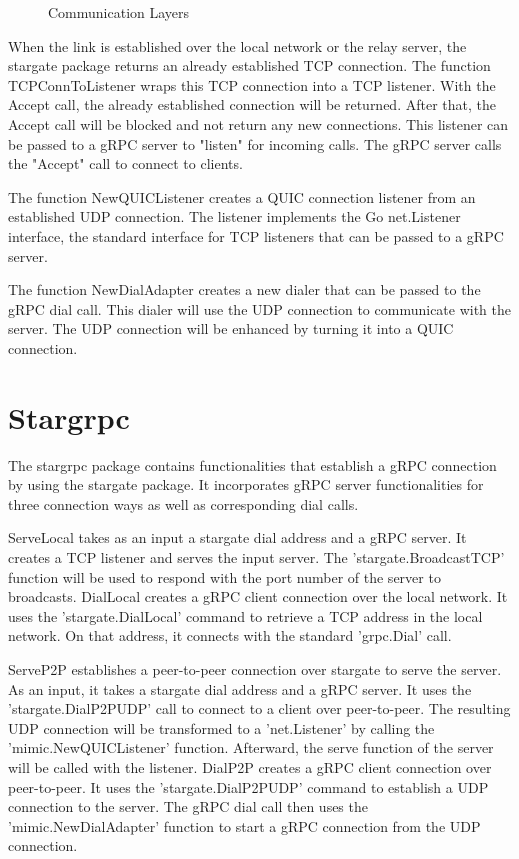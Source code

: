 \begin{figure}
  \centering
  
  \caption{Communication Layers}
  \label{fig:Communication-Layer}
\end{figure}

When the link is established over the local network or the relay server, the stargate package returns an already established TCP connection. The function TCPConnToListener wraps this TCP connection into a TCP listener. With the Accept call, the already established connection will be returned. After that, the Accept call will be blocked and not return any new connections. This listener can be passed to a gRPC server to "listen" for incoming calls. The gRPC server calls the "Accept" call to connect to clients.

The function NewQUICListener creates a QUIC connection listener from an established UDP connection. The listener implements the Go net.Listener interface, the standard interface for TCP listeners that can be passed to a gRPC server.

The function NewDialAdapter creates a new dialer that can be passed to the gRPC dial call. This dialer will use the UDP connection to communicate with the server. The UDP connection will be enhanced by turning it into a QUIC connection.

\section{Stargrpc}
The stargrpc package contains functionalities that establish a gRPC connection by using the stargate package. It incorporates gRPC server functionalities for three connection ways as well as corresponding dial calls.

ServeLocal takes as an input a stargate dial address and a gRPC server. It creates a TCP listener and serves the input server. The 'stargate.BroadcastTCP' function will be used to respond with the port number of the server to broadcasts. DialLocal creates a gRPC client connection over the local network. It uses the 'stargate.DialLocal' command to retrieve a TCP address in the local network. On that address, it connects with the standard 'grpc.Dial' call. 

ServeP2P establishes a peer-to-peer connection over stargate to serve the server. As an input, it takes a stargate dial address and a gRPC server. It uses the 'stargate.DialP2PUDP' call to connect to a client over peer-to-peer. The resulting UDP connection will be transformed to a 'net.Listener' by calling the 'mimic.NewQUICListener' function. Afterward, the serve function of the server will be called with the listener. DialP2P creates a gRPC client connection over peer-to-peer. It uses the 'stargate.DialP2PUDP' command to establish a UDP connection to the server. The gRPC dial call then uses the 'mimic.NewDialAdapter' function to start a gRPC connection from the UDP connection.

